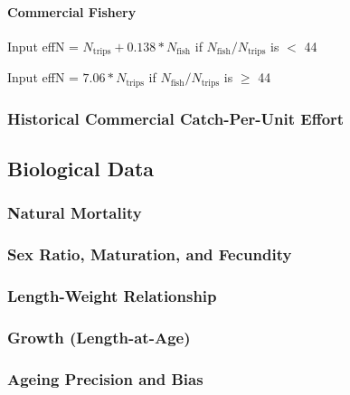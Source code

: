 \documentclass[12pt,]{article}
\let\oldparagraph\paragraph
\renewcommand{\paragraph}[1]{\oldparagraph{#1}\mbox{}}
\begin{document}
\paragraph{Commercial Fishery}\label{commercial-fishery}

\begin{centering}

Input effN = $N_{\text{trips}} + 0.138 * N_{\text{fish}}$ if $N_{\text{fish}}/N_{\text{trips}}$ is $<$ 44

Input effN = $7.06 * N_{\text{trips}}$ if $N_{\text{fish}}/N_{\text{trips}}$ is $\geq$ 44

\end{centering}

\subsubsection{Historical Commercial Catch-Per-Unit
Effort}\label{historical-commercial-catch-per-unit-effort}

\subsection{Biological Data}\label{biological-data}

\subsubsection{Natural Mortality}\label{natural-mortality}

\subsubsection{Sex Ratio, Maturation, and
Fecundity}\label{sex-ratio-maturation-and-fecundity}

\subsubsection{Length-Weight
Relationship}\label{length-weight-relationship}

\subsubsection{Growth (Length-at-Age)}\label{growth-length-at-age}

\subsubsection{Ageing Precision and
Bias}\label{ageing-precision-and-bias}
\end{document}

